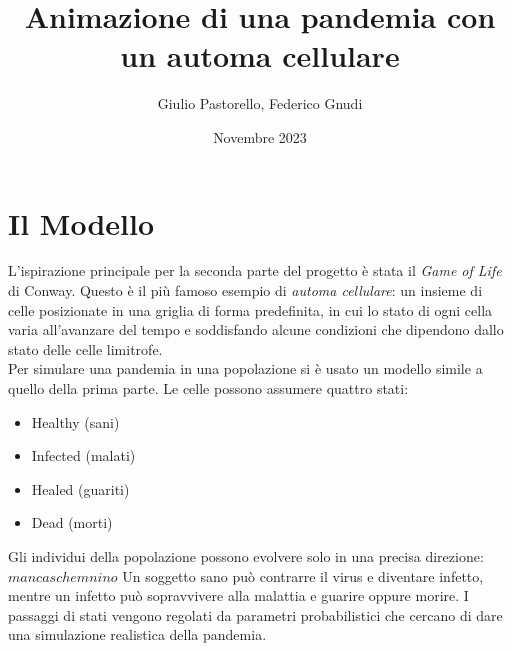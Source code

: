 \documentclass{article}
\title{Animazione di una pandemia con un automa cellulare}
\author{Giulio Pastorello, Federico Gnudi}
\date{Novembre 2023}
\begin{document}
\maketitle

\section{Il Modello}

\hspace{\parindent}L'ispirazione principale per la seconda parte del progetto è 
stata il \textit{Game of Life} di Conway. Questo è il più famoso esempio di 
\textit{automa cellulare}: un insieme di celle posizionate in una griglia di forma 
predefinita, in cui lo stato di ogni cella varia all'avanzare del tempo e 
soddisfando alcune condizioni che dipendono dallo stato delle celle limitrofe. \\
Per simulare una pandemia  in una popolazione si è usato un modello simile a 
quello della prima parte. Le celle possono assumere quattro stati: 
\begin{itemize}
    \item Healthy (sani)
    \item Infected (malati)
    \item Healed (guariti)
    \item Dead (morti)
\end{itemize}
Gli individui della popolazione possono evolvere solo in una precisa direzione: \\
$manca schemnino$
Un soggetto sano può contrarre il virus e diventare infetto, mentre un infetto
può sopravvivere alla malattia e guarire oppure morire. I passaggi di stati 
vengono regolati da parametri probabilistici che cercano di dare una simulazione
realistica della pandemia. \\
\end{document}
